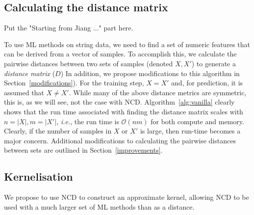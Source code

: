 \documentclass[preprint,12pt]{article}
\begin{document}

% 


\subsection{Calculating the distance matrix}
\label{distance_matrix}
\label{alg:vanilla}

Put the "Starting from Jiang ..." part here.

To use ML methods on string data, we need to find a set of numeric features that can be derived from a vector of samples.
To accomplish this, we calculate the pairwise distances between two sets of samples (denoted $X, X'$) to generate a \textit{distance matrix} ($D$) 
In addition, we propose modifications to this algorithm in Section~\ref{modifications}).
For the training step, $X = X'$ and, for prediction, it is assumed that $X \neq X'$.
While many of the above distance metrics are symmetric, this is, as we will see, not the case with NCD.
Algorithm~\ref{alg:vanilla} clearly shows that the run time associated with finding the distance matrix scales with $n = | X |, m = | X' |$, \textit{i.e.}, the run time is $\mathcal{O}(nm)$ for both compute and memory.
Clearly, if the number of samples in $X$ or $X'$ is large, then run-time becomes a major concern.
Additional modifications to calculating the pairwise distances between sets are outlined in Section~\ref{improvements}.






\subsection{Kernelisation}
\label{kernels}

We propose to use NCD to construct an approximate kernel, allowing NCD to be used with a much larger set of ML methods than as a distance.
\end{document}
